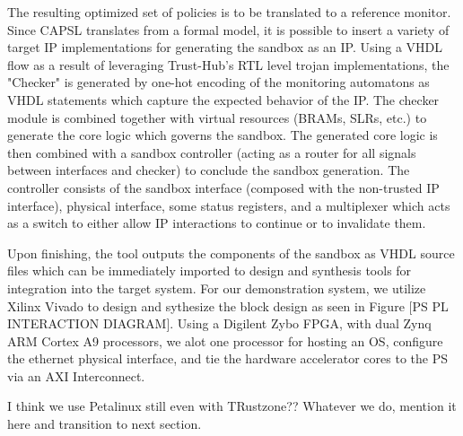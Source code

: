 \documentclass[sigconf]{acmart}
\theoremstyle{plain}
\theoremstyle{remark}
\begin{document}
The resulting optimized set of policies is to be translated to a reference monitor. Since CAPSL translates from a formal model, it is possible to insert a variety of target IP implementations for generating the sandbox as an IP. Using a VHDL flow as a result of leveraging Trust-Hub's RTL level trojan implementations, the "Checker" is generated by one-hot encoding of the monitoring automatons as VHDL statements which capture the expected behavior of the IP. The checker module is combined together with virtual resources (BRAMs, SLRs, etc.) to generate the core logic which governs the sandbox. The generated core logic is then combined with a sandbox controller (acting as a router for all signals between interfaces and checker) to conclude the sandbox generation. The controller consists of the sandbox interface (composed with the non-trusted IP interface), physical interface, some status registers, and a multiplexer which acts as a switch to either allow IP interactions to continue or to invalidate them.

Upon finishing, the tool outputs the components of the sandbox as VHDL source files which can be immediately imported to design and synthesis tools for integration into the target system. For our demonstration system, we utilize Xilinx Vivado to design and sythesize the block design as seen in Figure [PS PL INTERACTION DIAGRAM]. Using a Digilent Zybo FPGA, with dual Zynq ARM Cortex A9 processors, we alot one processor for hosting an OS, configure the ethernet physical interface, and tie the hardware accelerator cores to the PS via an AXI Interconnect.

I think we use Petalinux still even with TRustzone?? Whatever we do, mention it here and transition to next section.
\end{document}
